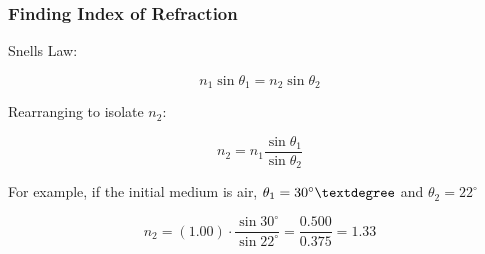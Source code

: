 \documentclass{beamer}
\begin{document}
\begin{frame}\frametitle{Finding Index of Refraction}

Snells Law:

\begin{equation}
n_1 \sin{\theta_1} = n_2 \sin{\theta_2}
\end{equation}

Rearranging to isolate $n_2$:

\begin{equation}
n_2 = n_1 \frac{\sin{\theta_1}}{\sin{\theta_2}}
\end{equation}

For example, if the initial medium is air, $\theta_1 = 30^\circ \textdegree$ and $\theta_2 = 22^\circ$

\begin{equation}
n_2 = (1.00) \cdot \frac{\sin{30^\circ}}{\sin{22^\circ}} = \frac{0.500}{0.375} = 1.33
\end{equation}

\end{frame}
\end{document}
